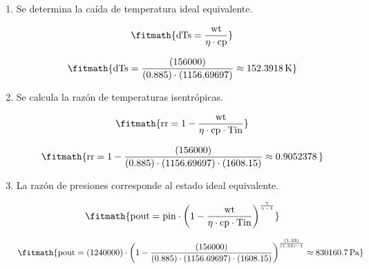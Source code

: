 \begin{enumerate}

\item Se determina la caída de temperatura ideal equivalente.

\[\fitmath{\mathrm{dTs}=\frac{\mathrm{wt}}{\eta\cdot \mathrm{cp}}}\]

\[\fitmath{\mathrm{dTs}=\frac{(156000)}{(0.885)\cdot (1156.69697)}\approx 152.3918\,\mathrm{K}}\]

\item Se calcula la razón de temperaturas isentrópicas.

\[\fitmath{\mathrm{rr}=1-\frac{\mathrm{wt}}{\eta\cdot \mathrm{cp}\cdot \mathrm{Tin}}}\]

\[\fitmath{\mathrm{rr}=1-\frac{(156000)}{(0.885)\cdot (1156.69697)\cdot (1608.15)}\approx 0.9052378\,}\]

\item La razón de presiones corresponde al estado ideal equivalente.

\[\fitmath{\mathrm{pout}=\mathrm{pin}\cdot {\left(1-\frac{\mathrm{wt}}{\eta\cdot \mathrm{cp}\cdot \mathrm{Tin}}\right)}^{\frac{\gamma}{\gamma-1}}}\]

\[\fitmath{\mathrm{pout}=(1240000)\cdot {\left(1-\frac{(156000)}{(0.885)\cdot (1156.69697)\cdot (1608.15)}\right)}^{\frac{(1.33)}{(1.33)-1}}\approx 830160.7\,\mathrm{Pa}}\]

\end{enumerate}
